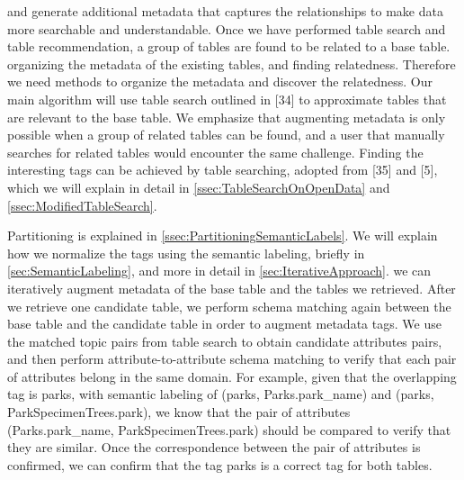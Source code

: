 and generate additional metadata that captures the relationships to make data more searchable and understandable.
Once we have performed table search and table recommendation, a group of tables are found to be related to a base table.
organizing the metadata of the existing tables, and finding relatedness.
Therefore we need methods to organize the metadata and discover the relatedness.
Our main algorithm will use table search outlined in \cite{Mudgal2018Deep}[34] to approximate tables that are relevant to the base table.
We emphasize that augmenting metadata is only possible when a group of related tables can be found, and a user that manually searches for related tables would encounter the same challenge.
Finding the interesting tags can be achieved by table searching, adopted from \cite{Nargesian2018Table}[35] and \cite{conf/esws/EllefiBDT16}[5], which we will explain in detail in \autoref{ssec:TableSearchOnOpenData} and \autoref{ssec:ModifiedTableSearch}.

Partitioning is explained in \autoref{ssec:PartitioningSemanticLabels}.
We will explain how we normalize the tags using the semantic labeling, briefly in \autoref{sec:SemanticLabeling}, and more in detail in \autoref{sec:IterativeApproach}.
we can iteratively augment metadata of the base table and the tables we retrieved.
After we retrieve one candidate table, we perform schema matching again between the base table and the candidate table in order to augment metadata tags. We use the matched topic pairs from table search to obtain candidate attributes pairs, and then perform attribute-to-attribute schema matching to verify that each pair of attributes belong in the same domain. For example, given that the overlapping tag is parks, with semantic labeling of (parks, Parks.park\_name) and (parks, ParkSpecimenTrees.park), we know that the pair of attributes (Parks.park\_name, ParkSpecimenTrees.park) should be compared to verify that they are similar. Once the correspondence between the pair of attributes is confirmed, we can confirm that the tag parks is a correct tag for both tables.

